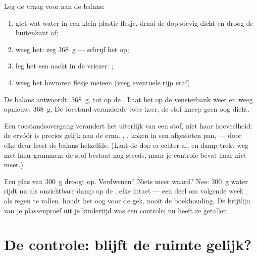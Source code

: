 \begin{method}\label{met:g6:water-states:weigh}
Leg de vraag voor aan de balans:
\begin{enumerate}
  \item giet wat water in een klein plastic flesje, draai de dop
        stevig dicht en droog de buitenkant af;
  \item weeg het: zeg \qty{368}{g} --- schrijf het op;
  \item leg het een nacht in de vriezer: ;
  \item weeg het bevroren flesje meteen (veeg eventuele rijp eraf).
\end{enumerate}
De balans antwoordt: \qty{368}{g}, tot op de . Laat het op de
vensterbank weer  en weeg opnieuw: \qty{368}{g}. De toestand
veranderde twee keer; de stof kneep geen oog dicht.
\end{method}

\begin{proposition}\label{prop:g6:water-states:mass}
Een toestandsovergang verandert het uiterlijk van een stof, niet haar
hoeveelheid: de  ervóór is precies gelijk aan de  erna.
, , koken in een afgesloten pan,  ---
door elke deur leest de balans hetzelfde. (Laat de dop er echter af,
en damp trekt weg met haar grammen: de stof bestaat nog steeds, maar
je controle bevat haar niet meer.)
\end{proposition}

\begin{example}\label{ex:g6:water-states:puddle}
Een plas van \qty{300}{g} droogt op. Verdwenen? Niets meer waard? Nee:
\qty{300}{g} water rijdt nu als onzichtbare damp op de , elke
 intact --- een deel om volgende week als regen te vallen.
 houdt het oog voor de gek, nooit de boekhouding. De
krijtlijn van je plassenproef uit je kindertijd was een controle; nu
heeft ze getallen.
\end{example}

\section{De controle: blijft de ruimte gelijk?}

